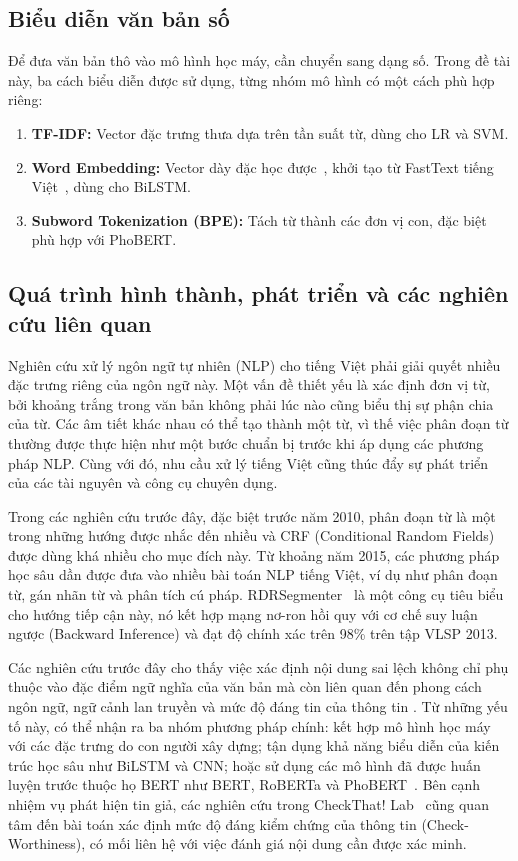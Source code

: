 \subsection{Biểu diễn văn bản số}

Để đưa văn bản thô vào mô hình học máy, cần chuyển sang dạng số. Trong đề tài này, ba cách biểu diễn được sử dụng, từng nhóm mô hình có một cách phù hợp riêng:

\begin{enumerate}[leftmargin=2.5em]
  \item \textbf{TF-IDF:} Vector đặc trưng thưa dựa trên tần suất từ, dùng cho LR và SVM.
  \item \textbf{Word Embedding:} Vector dày đặc học được~\cite{mikolov2013word2vec}, khởi tạo từ FastText tiếng Việt~\cite{bojanowski2017fasttext}, dùng cho BiLSTM.
  \item \textbf{Subword Tokenization (BPE):} Tách từ thành các đơn vị con, đặc biệt phù hợp với PhoBERT.
\end{enumerate}

\subsection{Quá trình hình thành, phát triển và các nghiên cứu liên quan}
Nghiên cứu xử lý ngôn ngữ tự nhiên (NLP) cho tiếng Việt phải giải quyết nhiều đặc trưng riêng của ngôn ngữ này. Một vấn đề thiết yếu là xác định đơn vị từ, bởi khoảng trắng trong văn bản không phải lúc nào cũng biểu thị sự phận chia của từ. Các âm tiết khác nhau có thể tạo thành một từ, vì thế việc phân đoạn từ thường được thực hiện như một bước chuẩn bị trước khi áp dụng các phương pháp NLP. Cùng với đó, nhu cầu xử lý tiếng Việt cũng thúc đẩy sự phát triển của các tài nguyên và công cụ chuyên dụng.

Trong các nghiên cứu trước đây, đặc biệt trước năm 2010, phân đoạn từ là một trong những hướng được nhắc đến nhiều và CRF (Conditional Random Fields) được dùng khá nhiều cho mục đích này. Từ khoảng năm 2015, các phương pháp học sâu dần được đưa vào nhiều bài toán NLP tiếng Việt, ví dụ như phân đoạn từ, gán nhãn từ và phân tích cú pháp. RDRSegmenter~\cite{rdrsegmenter2018} là một công cụ tiêu biểu cho hướng tiếp cận này, nó kết hợp mạng nơ-ron hồi quy với cơ chế suy luận ngược (Backward Inference) và đạt độ chính xác trên 98\% trên tập VLSP 2013.

Các nghiên cứu trước đây cho thấy việc xác định nội dung sai lệch không chỉ phụ thuộc vào đặc điểm ngữ nghĩa của văn bản mà còn liên quan đến phong cách ngôn ngữ, ngữ cảnh lan truyền và mức độ đáng tin của thông tin \cite{shu2017fake}. Từ những yếu tố này, có thể nhận ra ba nhóm phương pháp chính: kết hợp mô hình học máy với các đặc trưng do con người xây dựng; tận dụng khả năng biểu diễn của kiến trúc học sâu như BiLSTM và CNN; hoặc sử dụng các mô hình đã được huấn luyện trước thuộc họ BERT như BERT, RoBERTa và PhoBERT~\cite{zhou2020survey}. Bên cạnh nhiệm vụ phát hiện tin giả, các nghiên cứu trong CheckThat! Lab~\cite{nakov2022overview} cũng quan tâm đến bài toán xác định mức độ đáng kiểm chứng của thông tin (Check-Worthiness), có mối liên hệ với việc đánh giá nội dung cần được xác minh.

